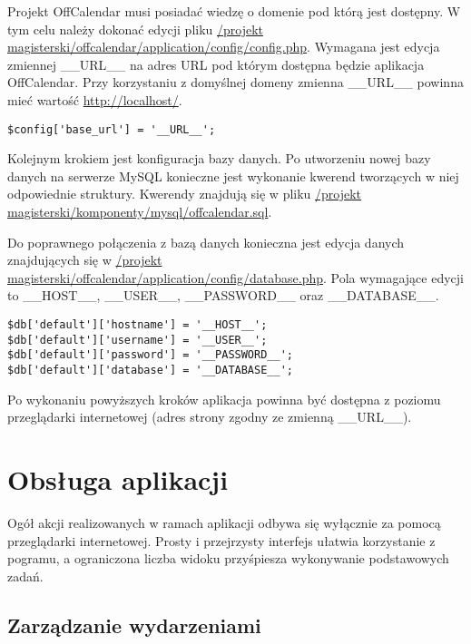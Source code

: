 Projekt OffCalendar musi posiadać wiedzę o domenie pod którą jest dostępny. W tym celu należy dokonać edycji pliku \url{/projekt magisterski/offcalendar/application/config/config.php}. Wymagana jest edycja zmiennej \_\_URL\_\_ na adres URL pod którym dostępna będzie aplikacja OffCalendar. Przy korzystaniu z domyślnej domeny zmienna \_\_URL\_\_ powinna mieć wartość \url{http://localhost/}.

\begin{lstlisting}[style=php, caption=Konfiguracja adresu URL dla projektu OffCalendar., label=amb, captionpos=b]
$config['base_url'] = '__URL__';
\end{lstlisting}

Kolejnym krokiem jest konfiguracja bazy danych. Po utworzeniu nowej bazy danych na serwerze MySQL konieczne jest wykonanie kwerend tworzących w niej odpowiednie struktury. Kwerendy znajdują się w pliku \url{/projekt magisterski/komponenty/mysql/offcalendar.sql}.

Do poprawnego połączenia z bazą danych konieczna jest edycja danych znajdujących się w \url{/projekt magisterski/offcalendar/application/config/database.php}. Pola wymagające edycji to \_\_HOST\_\_, \_\_USER\_\_, \_\_PASSWORD\_\_ oraz \_\_DATABASE\_\_.

\begin{lstlisting}[style=php, caption=Konfiguracja dostępu do bazy danych., label=amb, captionpos=b]
$db['default']['hostname'] = '__HOST__';
$db['default']['username'] = '__USER__';
$db['default']['password'] = '__PASSWORD__';
$db['default']['database'] = '__DATABASE__';
\end{lstlisting}

Po wykonaniu powyższych kroków aplikacja powinna być dostępna z poziomu przeglądarki internetowej (adres strony zgodny ze zmienną \_\_URL\_\_).

\section{Obsługa aplikacji}
\label{sec:obslAp}

Ogół akcji realizowanych w ramach aplikacji odbywa się wyłącznie za pomocą przeglądarki internetowej. Prosty i przejrzysty interfejs ułatwia korzystanie z pogramu, a ograniczona liczba widoku przyśpiesza wykonywanie podstawowych zadań.

\subsection{Zarządzanie wydarzeniami}
\label{sec:instrZarzWyd}

